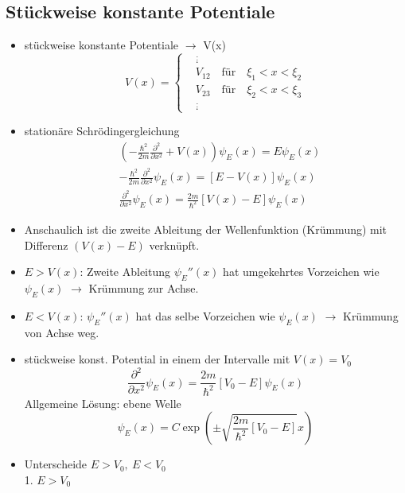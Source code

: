\documentclass[10pt,article,colorback,accentcolor=tud9d]{scrartcl}
\begin{document}
\subsection{Stückweise konstante Potentiale}
\begin{itemize}
	\item stückweise konstante Potentiale $\rightarrow$ V(x)
    \begin{equation}
    V(x)=\left\{
    \begin{aligned}
    &\stackrel{:}{.}\\
    &V_{12} \quad \text{für} \quad \xi_1<x<\xi_2\\
    &V_{23} \quad \text{für} \quad \xi_2<x<\xi_3\\
    &\stackrel{:}{.}
    \end{aligned}
    \right.
    \end{equation}
  \item stationäre Schrödingergleichung
    \begin{align}
      &\left(-\frac{\hbar^2}{2m}\frac{\partial^2}{\partial x^2}+V(x)\right)\psi_E(x)=E\psi_E(x)\\
      &-\frac{\hbar^2}{2m}\frac{\partial^2}{\partial x^2}\psi_E(x)=\left[E-V(x)\right]\psi_E(x)\\
      &\frac{\partial^2}{\partial x^2}\psi_E(x)=\frac{2m}{\hbar^2}\left[V(x)-E\right]\psi_E(x)
    \end{align}
  \item Anschaulich ist die zweite Ableitung der Wellenfunktion (Krümmung) mit Differenz $(V(x)-E)$ verknüpft.
  \item $E>V(x)$: Zweite Ableitung $\psi_E''(x)$ hat umgekehrtes Vorzeichen wie $\psi_E(x)$ $\rightarrow$ Krümmung zur Achse.
  \item $E<V(x)$: $\psi_E''(x)$ hat das selbe Vorzeichen wie $\psi_E(x)$ $\rightarrow$ Krümmung von Achse weg.
  \item stückweise konst. Potential in einem der Intervalle mit $V(x)=V_0$
    \begin{equation}
    \frac{\partial^2}{\partial x^2}\psi_E(x)=\frac{2m}{\hbar^2}[V_0-E]\psi_E(x)
    \end{equation}
    Allgemeine Lösung: ebene Welle 
    \begin{equation}
    \psi_E(x)=C\exp\left(\pm\sqrt{\frac{2m}{\hbar^2}[V_0-E]}x\right)
    \end{equation}
  \item Unterscheide $E>V_0, \ E<V_0$\\
    1. $E>V_0$

\end{itemize}
\end{document}
